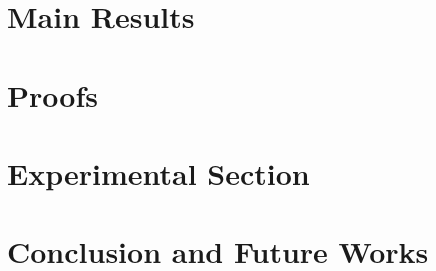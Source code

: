 \documentclass{llncs}
\begin{document}
\section{Main Results} 
\label{sec:results}


\section{Proofs}
\label{sec:proofTheorem}


\section{Experimental Section}
\label{sec:expt}


\section{Conclusion and Future Works}
\label{sec:conc}



\clearpage
\newpage



\end{document}
